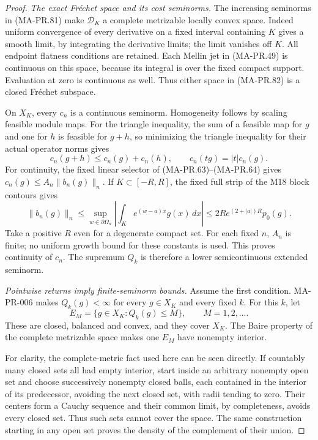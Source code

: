 \begin{proof}
\emph{The exact Fr\'echet space and its cost seminorms.}
The increasing seminorms in (MA-PR.81) make
\(\mathcal D_K\) a complete metrizable locally convex space.
Indeed uniform convergence of every derivative on a
fixed interval containing \(K\) gives a smooth limit,
by integrating the derivative limits; the limit vanishes
off \(K\).  All endpoint flatness conditions are retained.
Each Mellin jet in (MA-PR.49) is continuous on this
space, because its integral is over the fixed compact
support.  Evaluation at zero is continuous as well.
Thus either space in (MA-PR.82) is a closed Fr\'echet
subspace.

On \(X_K\), every \(c_n\) is a continuous seminorm.
Homogeneity follows by scaling feasible module maps.
For the triangle inequality, the sum of a feasible
map for \(g\) and one for \(h\) is feasible for \(g+h\),
so minimizing the triangle inequality for their actual
operator norms gives
\[
        c_n(g+h)\le c_n(g)+c_n(h),\qquad
        c_n(tg)=|t|c_n(g).
 \tag{MA-PR.87}
\]
For continuity, the fixed linear selector of
(MA-PR.63)--(MA-PR.64) gives
\(c_n(g)\le A_n\|b_n(g)\|_n\).
If \(K\subset[-R,R]\), the fixed full strip of the
M18 block contours gives
\[
 \|b_n(g)\|_n
       \le \sup_{w\in\partial\Omega_n}
                   \left|\int_K e^{(w-a)x}g(x)\,dx\right|
       \le 2R e^{(2+|a|)R}p_0(g).
 \tag{MA-PR.88}
\]
Take a positive \(R\) even for a degenerate compact set.
For each fixed \(n\), \(A_n\) is finite; no uniform
growth bound for these constants is used.
This proves continuity of \(c_n\).
The supremum \(Q_k\) is therefore a lower
semicontinuous extended seminorm.

\emph{Pointwise returns imply finite-seminorm bounds.}
Assume the first condition.
MA-PR-006 makes \(Q_k(g)<\infty\) for every \(g\in X_K\)
and every fixed \(k\).
For this \(k\), let
\[
             E_M=\{g\in X_K:Q_k(g)\le M\},
                         \qquad M=1,2,\ldots .
 \tag{MA-PR.89}
\]
These are closed, balanced and convex, and they cover \(X_K\).
The Baire property of the complete metrizable space
makes one \(E_M\) have nonempty interior.

For clarity, the complete-metric fact used here can
be seen directly.  If countably many closed sets all
had empty interior, start inside an arbitrary nonempty
open set and choose successively nonempty closed balls,
each contained in the interior of its predecessor,
avoiding the next closed set, with radii tending to zero.
Their centers form a Cauchy sequence and their common
limit, by completeness, avoids every closed set.
Thus such sets cannot cover the space.
The same construction starting in any open set proves
the density of the complement of their union.


\end{proof}
